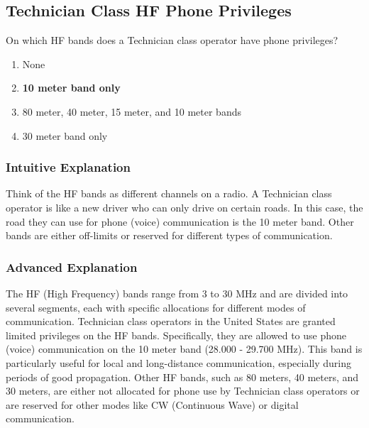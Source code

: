 \subsection{Technician Class HF Phone Privileges}
\label{T1B06}

\begin{tcolorbox}[colback=gray!10!white,colframe=black!75!black,title=T1B06]
On which HF bands does a Technician class operator have phone privileges?
\begin{enumerate}[label=\Alph*,noitemsep]
    \item None
    \item \textbf{10 meter band only}
    \item 80 meter, 40 meter, 15 meter, and 10 meter bands
    \item 30 meter band only
\end{enumerate}
\end{tcolorbox}

\subsubsection*{Intuitive Explanation}
Think of the HF bands as different channels on a radio. A Technician class operator is like a new driver who can only drive on certain roads. In this case, the road they can use for phone (voice) communication is the 10 meter band. Other bands are either off-limits or reserved for different types of communication.

\subsubsection*{Advanced Explanation}
The HF (High Frequency) bands range from 3 to 30 MHz and are divided into several segments, each with specific allocations for different modes of communication. Technician class operators in the United States are granted limited privileges on the HF bands. Specifically, they are allowed to use phone (voice) communication on the 10 meter band (28.000 - 29.700 MHz). This band is particularly useful for local and long-distance communication, especially during periods of good propagation. Other HF bands, such as 80 meters, 40 meters, and 30 meters, are either not allocated for phone use by Technician class operators or are reserved for other modes like CW (Continuous Wave) or digital communication.